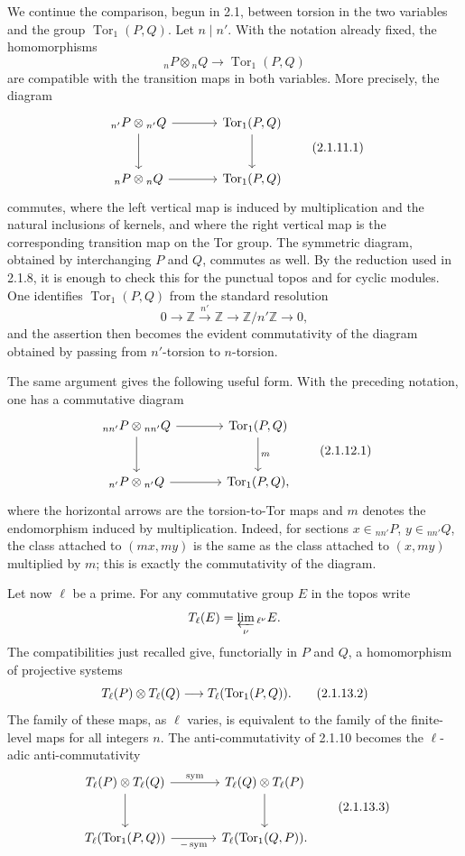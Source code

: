 \documentclass[11pt]{article}
\providecommand{\Tor}{\operatorname{Tor}}
\providecommand{\Z}{\mathbb Z}
\begin{document}
We continue the comparison, begun in 2.1, between torsion in the two variables and the group
\(\Tor_1(P,Q)\).  Let \(n\mid n'\).  With the notation already fixed, the homomorphisms
\[
        {}_nP\otimes {}_nQ\longrightarrow \Tor_1(P,Q)
\]
are compatible with the transition maps in both variables.  More precisely, the diagram
\[
\begin{tikzcd}[column sep=large,row sep=large]
 {}_{n'}P\otimes {}_{n'}Q \arrow[r]\arrow[d] & \Tor_1(P,Q)\arrow[d]\\
 {}_{n}P\otimes {}_{n}Q \arrow[r] & \Tor_1(P,Q)
\end{tikzcd}
\qquad\text{(2.1.11.1)}
\]
commutes, where the left vertical map is induced by multiplication and the natural inclusions of kernels, and where the right vertical map is the corresponding transition map on the Tor group.  The symmetric diagram, obtained by interchanging \(P\) and \(Q\), commutes as well.  By the reduction used in 2.1.8, it is enough to check this for the punctual topos and for cyclic modules.  One identifies \(\Tor_1(P,Q)\) from the standard resolution
\[
        0\longrightarrow \Z\xrightarrow{n'}\Z\longrightarrow \Z/n'\Z\longrightarrow 0,
\]
and the assertion then becomes the evident commutativity of the diagram obtained by passing from \(n'\)-torsion to \(n\)-torsion.

The same argument gives the following useful form.  With the preceding notation, one has a commutative diagram
\[
\begin{tikzcd}[column sep=large,row sep=large]
 {}_{nn'}P\otimes {}_{nn'}Q \arrow[r]\arrow[d] & \Tor_1(P,Q)\arrow[d,"m"]\\
 {}_{n'}P\otimes {}_{n'}Q \arrow[r] & \Tor_1(P,Q),
\end{tikzcd}
\qquad\text{(2.1.12.1)}
\]
where the horizontal arrows are the torsion-to-Tor maps and \(m\) denotes the endomorphism induced by multiplication.  Indeed, for sections \(x\in {}_{nn'}P\), \(y\in {}_{nn'}Q\), the class attached to \((mx,my)\) is the same as the class attached to \((x,my)\) multiplied by \(m\); this is exactly the commutativity of the diagram.

Let now \(\ell\) be a prime.  For any commutative group \(E\) in the topos write
\[
        T_\ell(E)=\varprojlim_\nu {}_{\ell^\nu}E.
\]
The compatibilities just recalled give, functorially in \(P\) and \(Q\), a homomorphism of projective systems
\[
        \Tate_\ell(P)\otimes \Tate_\ell(Q)
        \longrightarrow \Tate_\ell(\Tor_1(P,Q)).
\qquad\text{(2.1.13.2)}
\]
The family of these maps, as \(\ell\) varies, is equivalent to the family of the finite-level maps for all integers \(n\).  The anti-commutativity of 2.1.10 becomes the \(\ell\)-adic anti-commutativity
\[
\begin{tikzcd}[column sep=large,row sep=large]
 \Tate_\ell(P)\otimes \Tate_\ell(Q) \arrow[r,"\mathrm{sym}"]\arrow[d] &
 \Tate_\ell(Q)\otimes \Tate_\ell(P)\arrow[d]\\
 \Tate_\ell(\Tor_1(P,Q))\arrow[r,"-\,\mathrm{sym}"'] &
 \Tate_\ell(\Tor_1(Q,P)).
\end{tikzcd}
\qquad\text{(2.1.13.3)}
\]
\end{document}
